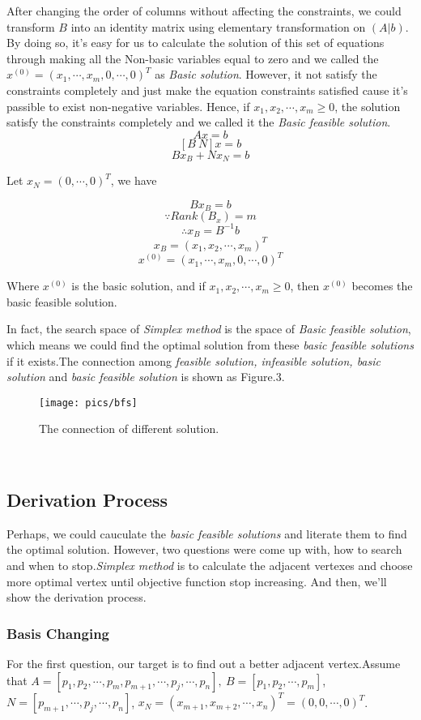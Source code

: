 \documentclass[12pt,a4paper]{article}
\begin{document}
	\indent After changing the order of columns without affecting the constraints, we could transform $B$ into an identity matrix using elementary transformation on $(A|b)$. By doing so, it's easy for us to calculate the solution of this set of equations through making all the Non-basic variables equal to zero and we called the $x^{(0)}=(x_1,\cdots,x_m,0,\cdots,0)^T$ as \textit{Basic solution}. However, it not satisfy the constraints completely and just make the equation constraints satisfied cause it's passible to exist non-negative variables. Hence, if $x_1,x_2,\cdots,x_m \geq 0$,  the solution satisfy the constraints completely and we called it the \textit{Basic feasible solution}. \\
		$$Ax=b $$
		$$[B\ N]x =b $$
		$$Bx_B+Nx_N =b $$
	
	Let $ x_N=(0,\cdots,0)^T$, we have
	
	$$Bx_B =b$$
	$$\because Rank(B_x) =m $$
	$$\therefore x_B =B^{-1}b$$
	$$x_B =(x_1,x_2,\cdots, x_m)^T$$
	$$x^{(0)} =(x_1,\cdots, x_m,0,\cdots,0)^T$$
	
	Where $x^{(0)}$ is the basic solution, and if $x_1,x_2,\cdots,x_m \geq 0$, then $x^{(0)}$ becomes the basic feasible solution.
	
	In fact, the search space of \textit{Simplex method} is the space of \textit{Basic feasible solution}, which means we could find the optimal solution from these \textit{basic feasible solutions} if it exists.The connection among \textit{feasible solution, infeasible solution, basic solution }and \textit{basic feasible solution} is shown as Figure.3.\label{Fig.3}
	
	\begin{figure}[h]
	\centering 
	\texttt{[image: pics/bfs]}
	\caption{The connection of different solution.} 
	\label{Fig.3}
	\end{figure}\\
	
	\subsection{Derivation Process}
	\indent Perhaps, we could cauculate the \textit{basic feasible solutions} and literate them to find the optimal solution. However, two questions were come up with, how to search and when to stop.\textit{Simplex method} is to calculate the adjacent vertexes and choose more optimal vertex until objective function stop increasing.  And then, we'll show the derivation process. 
\subsubsection{Basis Changing}
	For the first question, our target is to find out a better adjacent vertex.Assume that $A=[p_1,p_2,\cdots,p_m,p_{m+1},\cdots,p_j,\cdots,p_n],\ B=[p_1,p_2,\cdots,p_m]$, $N = [p_{m+1},\cdots,p_j,\cdots,p_n]$, $x_N=(x_{m+1},x_{m+2},\cdots,x_n)^T=(0,0,\cdots,0)^T$.
	
\end{document}
